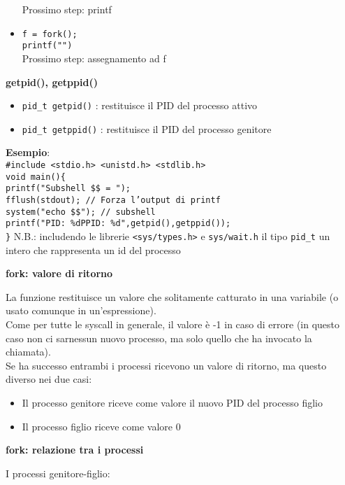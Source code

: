 \begin{flushleft}
\begin{flushleft}
\begin{itemize}
            Prossimo step: printf
      \item \texttt{f = fork(); \\ printf("\n")} \\
            Prossimo step: assegnamento ad f
    \end{itemize}
    \textbf{getpid(), getppid()} 
    \begin{itemize}
      \item \texttt{pid\_t getpid()} : restituisce il PID del processo attivo
      \item \texttt{pid\_t getppid()} : restituisce il PID del processo genitore
    \end{itemize}
    \textbf{Esempio}: \\ 
    \texttt{\#include <stdio.h> <unistd.h> <stdlib.h> \\
            void main()\{ \\
            \halftab printf("Subshell \$\$ = "); \\
            \halftab fflush(stdout); // Forza l'output di printf\\
            \halftab system("echo \$\$"); // subshell\\
            \halftab printf("PID: \%dPPID: \%d\n",getpid(),getppid());\\
            \}}
    N.B.: includendo le librerie \texttt{<sys/types.h>} e \texttt{sys/wait.h} il tipo \texttt{pid\_t} 
    \ace un intero che rappresenta un id del processo \par  
    \textbf{fork: valore di ritorno} \par
    La funzione restituisce un valore che solitamente \ace catturato in una variabile (o usato 
    comunque in un'espressione). \\
    Come per tutte le syscall in generale, il valore è -1 in caso di errore (in questo caso 
    non ci sar\aca nessun nuovo processo, ma solo quello che ha invocato la chiamata). \\
    Se ha successo entrambi i processi ricevono un valore di ritorno, ma questo \ace diverso
    nei due casi:
    \begin{itemize}
      \item Il processo genitore riceve come valore il nuovo PID del processo figlio
      \item Il processo figlio riceve come valore 0
    \end{itemize}
    \textbf{fork: relazione tra i processi} \par
    I processi genitore-figlio:

\end{flushleft}
\end{flushleft}
